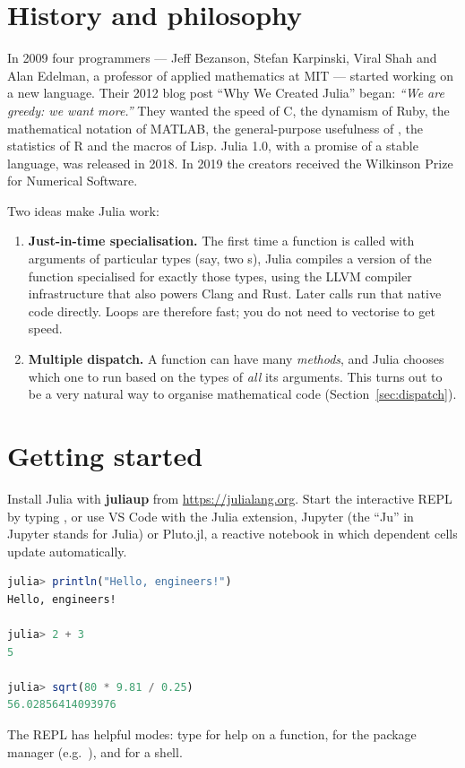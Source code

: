 \section{History and philosophy}

\begin{history}
In 2009 four programmers --- Jeff Bezanson, Stefan Karpinski, Viral Shah and Alan
Edelman, a professor of applied mathematics at MIT --- started working on a new language.
Their 2012 blog post ``Why We Created Julia'' began: \emph{``We are greedy: we want more.''}
They wanted the speed of C, the dynamism of Ruby, the mathematical notation of MATLAB, the
general-purpose usefulness of \py, the statistics of R and the macros of Lisp. Julia 1.0,
with a promise of a stable language, was released in 2018. In 2019 the creators received
the Wilkinson Prize for Numerical Software.
\end{history}

Two ideas make Julia work:
\begin{enumerate}
\item \textbf{Just-in-time specialisation.} The first time a function is called with
  arguments of particular types (say, two s), Julia compiles a version of the
  function specialised for exactly those types, using the LLVM compiler infrastructure
  that also powers Clang and Rust. Later calls run that native code directly. Loops are
  therefore fast; you do not need to vectorise to get speed.
\item \textbf{Multiple dispatch.} A function can have many \emph{methods}, and Julia
  chooses which one to run based on the types of \emph{all} its arguments. This turns out
  to be a very natural way to organise mathematical code (Section~\ref{sec:dispatch}).
\end{enumerate}

\section{Getting started}

Install Julia with \textbf{juliaup} from \url{https://julialang.org}. Start the
interactive REPL by typing , or use VS Code with the Julia extension, Jupyter
(the ``Ju'' in Jupyter stands for Julia) or Pluto.jl, a reactive notebook in which
dependent cells update automatically.
\begin{lstlisting}[language=Julia]
julia> println("Hello, engineers!")
Hello, engineers!

julia> 2 + 3
5

julia> sqrt(80 * 9.81 / 0.25)
56.02856414093976
\end{lstlisting}
The REPL has helpful modes: type  for help on a function, \code{]} for the package
manager (e.g.\ \code{] add Plots}), and \code{;} for a shell.

